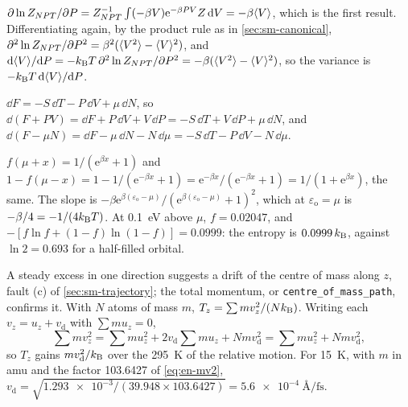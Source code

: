 $\partial\ln Z_{NPT}/\partial P = Z_{NPT}^{-1}
\int(-\beta V)\mathrm{e}^{-\beta PV}Z\,\mathrm{d} V = -\beta\langle V \rangle$, which is
the first result. Differentiating again, by the product rule as in
\cref{sec:sm-canonical}, $\partial^2\ln Z_{NPT}/\partial P^2 =
\beta^2(\langle V^2 \rangle - \langle V \rangle^2)$, and $\mathrm{d}\langle V \rangle/\mathrm{d} P = -k_{\mathrm{B}} T\,
\partial^2\ln Z_{NPT}/\partial P^2 = -\beta(\langle V^2 \rangle - \langle V \rangle^2)$, so
the variance is $-k_{\mathrm{B}} T\,\mathrm{d}\langle V \rangle/\mathrm{d} P$.

$\dd F = -S\,\dd T - P\,\dd V + \mu\,\dd N$,
so $\dd(F + PV) = \dd F + P\,\dd V + V\,\dd P = -S\,\dd T + V\,\dd P +
\mu\,\dd N$, and $\dd(F - \mu N) = \dd F - \mu\,\dd N - N\,\dd\mu = -S\,\dd
T - P\,\dd V - N\,\dd\mu$.

$f(\mu + x) = 1/(\mathrm{e}^{\beta x} + 1)$ and
$1 - f(\mu - x) = 1 - 1/(\mathrm{e}^{-\beta x} + 1) = \mathrm{e}^{-\beta
x}/(\mathrm{e}^{-\beta x} + 1) = 1/(1 + \mathrm{e}^{\beta x})$, the same.
The slope is $-\beta\mathrm{e}^{\beta(\varepsilon_{\mathrm o} - \mu)}/(\mathrm{e}^{
\beta(\varepsilon_{\mathrm o} - \mu)} + 1)^2$, which at $\varepsilon_{\mathrm o} = \mu$ is
$-\beta/4 = -1/(4k_{\mathrm{B}} T)$. At \SI{0.1}{\electronvolt} above $\mu$, $f =
0.02047$, and $-[f\ln f + (1 - f)\ln(1 - f)] = 0.0999$: the entropy is
$0.0999\,k_{\mathrm{B}}$, against $\ln2 = 0.693$ for a half-filled orbital.

A steady excess in one direction suggests a
drift of the centre of mass along $z$, fault (c) of
\cref{sec:sm-trajectory}; the total momentum, or
\texttt{centre\_of\_mass\_path}, confirms it. With $N$ atoms of mass $m$,
$T_z = \sum mv_z^2/(Nk_{\mathrm{B}})$. Writing each $v_z = u_z + v_{\mathrm d}$ with
$\sum mu_z = 0$,
\begin{equation*}
   \sum mv_z^2 = \sum mu_z^2 + 2v_{\mathrm d}\sum mu_z + Nmv_{\mathrm d}^2
   = \sum mu_z^2 + Nmv_{\mathrm d}^2 ,
\end{equation*}
so $T_z$ gains $mv_{\mathrm d}^2/k_{\mathrm{B}}$ over the \SI{295}{\kelvin} of the
relative motion. For \SI{15}{\kelvin}, with $m$ in amu and the factor
103.6427 of \cref{eq:en-mv2}, $v_{\mathrm d} = \sqrt{\num{1.293e-3}/
(39.948\times103.6427)} = \SI{5.6e-4}{\angstrom\per\femto\second}$.
